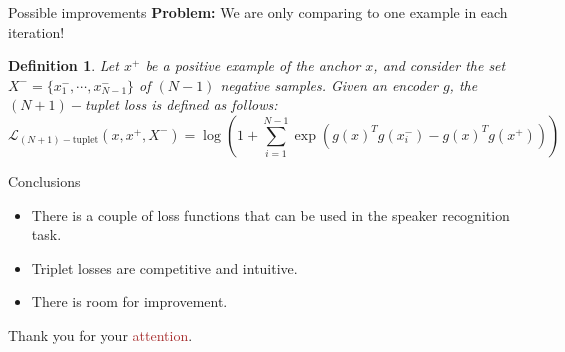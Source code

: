 \documentclass[aspectratio=169]{beamer}
\newcommand{\ps}{x^+}
\newcommand{\ns}{x^-}
\newtheorem{defi}{Definition}
\begin{document}
\begin{frame}{Possible improvements}
  \textbf{Problem:} We are only comparing to one example in each iteration!
  \pause

  \begin{defi}
    Let $\ps$ be a positive example of the anchor $x$, and consider the set $X^- = \{\ns_1,\cdots,\ns_{N-1}\}$ of $(N-1)$ negative samples. Given an encoder $g$, the $(N+1)-$tuplet loss is defined as follows:
    \begin{equation}\label{nplus1:tuplet:loss}
      \mathcal L_{(N+1)-\text{tuplet}}(x,\ps,X^-) = \log \left( 1+ \sum_{i=1}^{N-1} \exp \left(g(x)^T g(\ns_i) - g(x)^T g(\ps)\right)\right)
    \end{equation}
  \end{defi}
\end{frame}

\begin{frame}{Conclusions}

  \begin{itemize}
    \item There is a couple of loss functions that can be used in the speaker recognition task.
          \pause
    \item Triplet losses are competitive and intuitive.
          \pause
    \item There is room for improvement.
  \end{itemize}
\end{frame}

\appendix

\begin{frame}
  Thank you for your \textcolor{brown}{attention}.
\end{frame}


\begin{frame}[noframenumbering]

  \vspace{0.5cm}
  
  

\end{frame}
\end{document}
